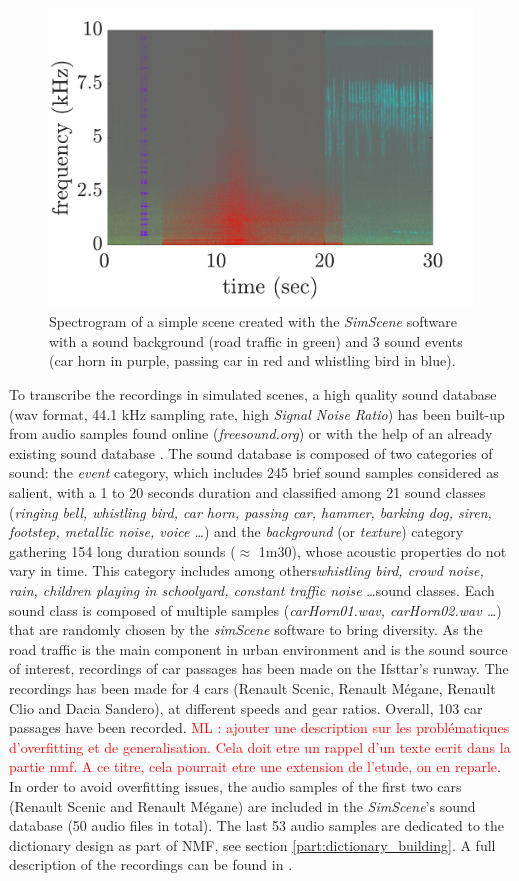 \documentclass[review,5p,twocolumn,sort&compress,times]{elsarticle}
\newcommand{\ml}[1]{\textcolor{red}{ML : #1}}
\begin{document}
\begin{figure}[t]
    \centering
       \includegraphics[width=.8\linewidth]{./figures/exampleSimScene.pdf}
    \caption{Spectrogram of a simple scene created with the \textit{SimScene} software with a sound background (road traffic in green) and 3 sound events (car horn in purple, passing car in red and whistling bird in blue).}
    \label{fig:example_simScene}
\end{figure}

To transcribe the recordings in simulated scenes, a high quality sound database (wav format, 44.1 kHz sampling rate, high \textit{Signal Noise Ratio}) has been built-up from audio samples found online (\textit{freesound.org}) or with the help of an already existing sound database \cite{salamon2014dataset}. The sound database is composed of two categories of sound: the \textit{event} category, which includes 245 brief sound samples considered as salient, with a 1 to 20 seconds duration and classified among 21 sound classes (\textit{ringing bell, whistling bird, car horn, passing car, hammer, barking dog, siren, footstep, metallic noise, voice \dots}) and the \textit{background} (or \textit{texture}) category gathering 154 long duration sounds ($\approx$ 1m30), whose acoustic properties do not vary in time. This category includes among others\textit{whistling bird, crowd noise, rain, children playing in schoolyard, constant traffic noise} \dots sound classes. Each sound class is composed of multiple samples (\textit{carHorn01.wav, carHorn02.wav \dots}) that are randomly chosen by the \textit{simScene} software to bring diversity.
As the road traffic is the main component in urban environment and is the sound source of interest, recordings of car passages has been made on the Ifsttar's runway. The recordings has been made for 4 cars (Renault Scenic, Renault M\'egane, Renault Clio and Dacia Sandero),  at different speeds and gear ratios. Overall, 103 car passages have been recorded. \ml{ajouter une description sur les problématiques d'overfitting et de generalisation. Cela doit etre un rappel d'un texte ecrit dans la partie nmf. A ce titre, cela pourrait etre une extension de l'etude, on en reparle}. In order to avoid overfitting issues, the audio samples of the first two cars (Renault Scenic and Renault M\'egane) are included in the \textit{SimScene}'s sound database (50 audio files in total). The last 53 audio samples are dedicated to the dictionary design as part of NMF, see section \ref{part:dictionary_building}. A full description of the recordings can be found in \cite{gloaguen_creation_2017}.
\end{document}
